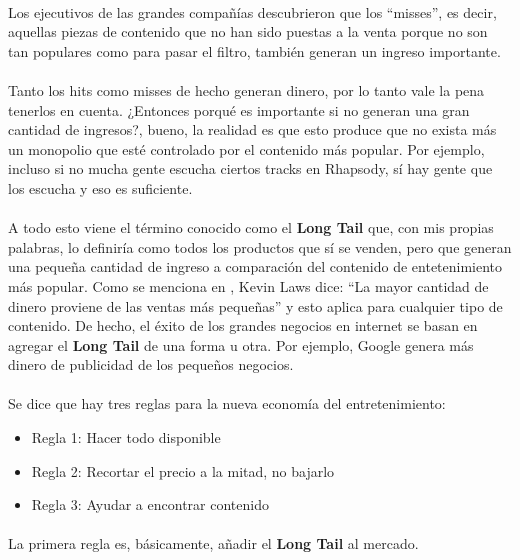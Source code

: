 \documentclass{article}
\begin{document}
\paragraph{}
Los ejecutivos de las grandes compañías descubrieron que los ``misses'', es
decir, aquellas piezas de contenido que no han sido puestas a la venta porque
no son tan populares como para pasar el filtro, también generan un
ingreso importante.

\paragraph{}
Tanto los hits como misses de hecho generan dinero, por lo tanto vale la pena
tenerlos en cuenta. ¿Entonces porqué es importante si no generan una gran cantidad
de ingresos?, bueno, la realidad es que esto produce que no exista más un
monopolio que esté controlado por el contenido más popular.  Por ejemplo,
incluso si no mucha gente escucha ciertos tracks en Rhapsody, sí hay gente
que los escucha y eso es suficiente.

\paragraph{}
A todo esto viene el término conocido como el \textbf{Long Tail} que, con mis propias
palabras, lo definiría como todos los productos que sí se venden, pero que
generan una pequeña cantidad de ingreso a comparación del contenido de
entetenimiento más popular.
Como se menciona en \cite{tlt}, Kevin Laws dice: ``La mayor cantidad de dinero proviene de las
ventas más pequeñas'' y esto aplica para cualquier tipo de contenido.
De hecho, el éxito de los grandes negocios en internet se basan en agregar el
\textbf{Long Tail} de una forma u otra. Por ejemplo, Google genera más dinero
de publicidad de los pequeños negocios.

\paragraph{}
Se dice que hay tres reglas para la nueva economía del entretenimiento:
\begin{itemize}
	\item
	Regla 1: Hacer todo disponible
	\item
	Regla 2: Recortar el precio a la mitad, no bajarlo
	\item
	Regla 3: Ayudar a encontrar contenido
\end{itemize}

\paragraph{}
La primera regla es, básicamente, añadir el \textbf{Long Tail} al mercado.
\end{document}
